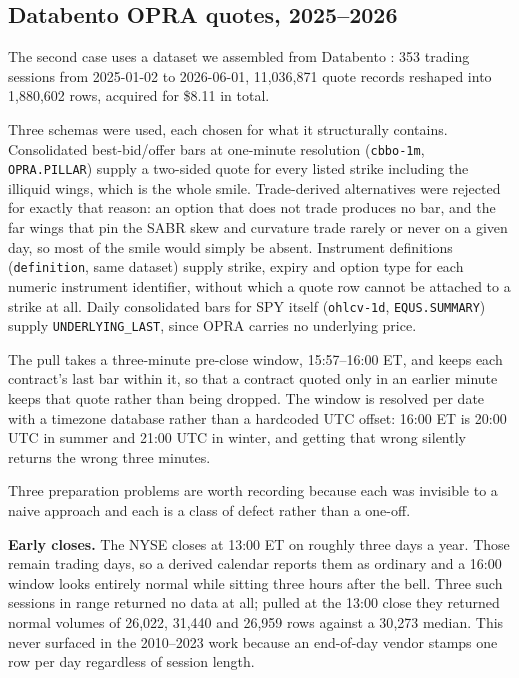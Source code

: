 \documentclass[11pt]{article}
\begin{document}
\subsection{Databento OPRA quotes, 2025--2026}
\label{sec:databento}

The second case uses a dataset we assembled from Databento \citep{databento}: 353 trading
sessions from
2025-01-02 to 2026-06-01, 11{,}036{,}871 quote records reshaped into 1{,}880{,}602 rows,
acquired for \$8.11 in total.

Three schemas were used, each chosen for what it structurally contains. Consolidated
best-bid/offer bars at one-minute resolution (\texttt{cbbo-1m}, \texttt{OPRA.PILLAR})
supply a two-sided quote for every listed strike including the illiquid wings, which is
the whole smile. Trade-derived alternatives were rejected for exactly that reason: an
option that does not trade produces no bar, and the far wings that pin the SABR skew and
curvature trade rarely or never on a given day, so most of the smile would simply be
absent. Instrument definitions (\texttt{definition}, same dataset) supply strike, expiry
and option type for each numeric instrument identifier, without which a quote row cannot
be attached to a strike at all. Daily consolidated bars for SPY itself
(\texttt{ohlcv-1d}, \texttt{EQUS.SUMMARY}) supply \texttt{UNDERLYING\_LAST}, since OPRA
carries no underlying price.

The pull takes a three-minute pre-close window, 15:57--16:00 ET, and keeps each
contract's last bar within it, so that a contract quoted only in an earlier minute keeps
that quote rather than being dropped. The window is resolved per date with a timezone
database rather than a hardcoded UTC offset: 16:00 ET is 20:00 UTC in summer and 21:00
UTC in winter, and getting that wrong silently returns the wrong three minutes.

Three preparation problems are worth recording because each was invisible to a naive
approach and each is a class of defect rather than a one-off.

\textbf{Early closes.} The NYSE closes at 13:00 ET on roughly three days a year. Those
remain trading days, so a derived calendar reports them as ordinary and a 16:00 window
looks entirely normal while sitting three hours after the bell. Three such sessions in
range returned no data at all; pulled at the 13:00 close they returned normal volumes of
26{,}022, 31{,}440 and 26{,}959 rows against a 30{,}273 median. This never surfaced in
the 2010--2023 work because an end-of-day vendor stamps one row per day regardless of
session length.
\end{document}
